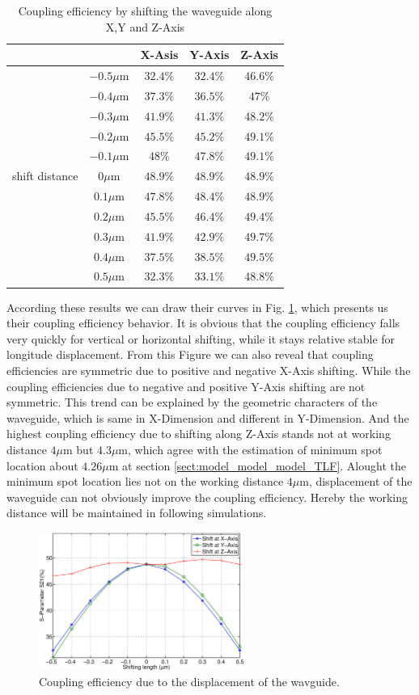 \begin{table}
\caption{Coupling efficiency by shifting the waveguide along X,Y and Z-Axis}
\centering
\begin{tabular}{c|c|ccc}
\hline
	\multicolumn{2}{c}{} & X-Asis & Y-Axis & Z-Axis \\
\hline
\multirow{11}{*}{\parbox[t]{0.1\textwidth}{shift distance}}&$-0.5\mu$m 		&$32.4\%$	&$32.4\%$&$46.6\%$	\\
&$-0.4\mu$m		&$37.3\%$	&$36.5\%$&$47\%$	\\
&$-0.3\mu$m 		&$41.9\%$	&$41.3\%$&$48.2\%$	\\
&$-0.2\mu$m	  &$45.5\%$	&$45.2\%$&$49.1\%$	\\
&$-0.1\mu$m		&$48\%$	&$47.8\%$&$49.1\%$	\\
&$0\mu$m			  &$48.9\%$	&$48.9\%$&$48.9\%$	\\
&$0.1\mu$m			&$47.8\%$	&$48.4\%$&$48.9\%$	\\
&$0.2\mu$m			&$45.5\%$	&$46.4\%$&$49.4\%$	\\
&$0.3\mu$m			&$41.9\%$	&$42.9\%$&$49.7\%$	\\
&$0.4\mu$m			&$37.5\%$	&$38.5\%$&$49.5\%$	\\
&$0.5\mu$m			&$32.3\%$	&$33.1\%$&$48.8\%$	\\
\hline
\end{tabular}
\label{tab:shift_result}
\end{table}
According these results we can draw their curves in Fig. \ref{fig:shift_curve}, which presents us their coupling efficiency behavior. It is obvious that the coupling efficiency falls very quickly for vertical or horizontal shifting, while it stays relative stable for longitude displacement. From this Figure we can also reveal that coupling efficiencies are symmetric due to positive and negative X-Axis shifting. While the coupling efficiencies due to negative and positive Y-Axis shifting are not symmetric. This trend can be explained by the geometric characters of the waveguide, which is same in X-Dimension and different in Y-Dimension. And the highest coupling efficiency due to shifting along Z-Axis stands not at working distance $4\mu$m but $4.3\mu$m, which agree with the estimation of minimum spot location about $4.26\mu$m at section \ref{sect:model_model_model_TLF}. Alought the minimum spot location lies not on the working distance $4\mu$m, displacement of the waveguide can not obviously improve the coupling efficiency. Hereby the working distance will be maintained in following simulations.
  
\begin{figure}[!ht]
\centering
\includegraphics[width=0.6\textwidth]{bilder/shift_curve}
\caption{Coupling efficiency due to the displacement of the wavguide.}
\label{fig:shift_curve}
\end{figure}
